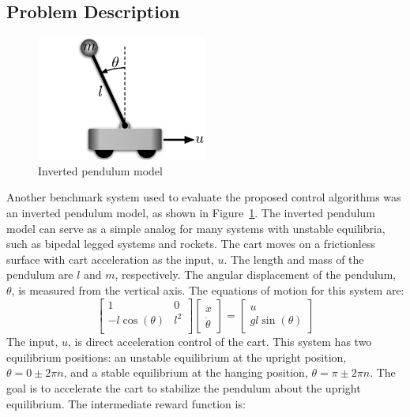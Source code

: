 \subsection{Problem Description}
%
\begin{figure}[tb]
\begin{center}
\includegraphics[width = 0.5\textwidth]{figures/figures_RL_model_based_control/Inverted_pendulum_model.pdf}
\caption{Inverted pendulum model}
\label{fig_chap2:inverted_pendulum}
\end{center}
\end{figure}
%
Another benchmark system used to evaluate the proposed control algorithms was an inverted pendulum model, as shown in Figure~\ref{fig_chap2:inverted_pendulum}. The inverted pendulum model can serve as a simple analog for many systems with unstable equilibria, such as bipedal legged systems and rockets.
The cart moves on a frictionless surface with cart acceleration as the input, $u$. The length and mass of the pendulum are $l$ and $m$, respectively. The angular displacement of the pendulum, $\theta$, is measured from the vertical axis. The equations of motion for this system are:
%
\begin{equation}
\left [
\begin{array}{cc}
1 & 0 \\
-l\cos(\theta) & l^2 \\
\end{array}
\right ]
\left [ 
\begin{array}{c}
\ddot{x} \\
\ddot{\theta}
\end{array}
\right]
=
\left [ 
\begin{array}{c}
u \\
gl\sin(\theta)
\end{array}
\right]
\end{equation}
%
The input, $u$, is direct acceleration control of the cart. This system has two equilibrium positions: an unstable equilibrium at the upright position, $\theta=0\pm 2\pi n$, and a stable equilibrium at the hanging position, $\theta=\pi\pm 2\pi n$. The goal is to accelerate the cart to stabilize the pendulum about the upright equilibrium. The intermediate reward function is:
